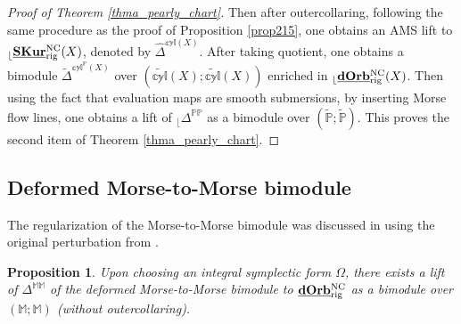 \documentclass[reqno, 10pt]{amsart}
\numberwithin{equation}{section}
\numberwithin{equation}{section}
\newtheorem{prop}[thm]{Proposition}
\theoremstyle{definition}
\theoremstyle{remark}
\newcommand{\mb}{\mathbb}
\renewcommand{\outer}{{}_{\lfloor}}
\newcommand{\wh}{\widehat}
\newcommand{\uds}[1]{\underline{\smash{#1}}}
\begin{document}
\begin{proof}[Proof of Theorem \ref{thma_pearly_chart}]
Then after outercollaring, following the same procedure as the proof of Proposition \ref{prop215}, one obtains an AMS lift  to $\outer \uds{\bf SKur}_{\rm rig}^{\rm NC}(X)$, denoted by $\wh{\mb\Delta}^{\mb{cyl} (X)}$. After taking quotient, one obtains a bimodule $\widetilde{\mb\Delta}^{\mb{cyl}^{\mb P} (X)}$ over $(\widetilde{\mb{cyl}}  (X); \widetilde{\mb{cyl}}  (X))$ enriched in $\outer \uds{\bf dOrb}^{\rm NC}_{\rm rig}(X)$. Then using the fact that evaluation maps are smooth submersions, by inserting Morse flow lines, one obtains a lift of $\outer \mb{\Delta}^{\mb{PP}}$ as a bimodule over $(\tilde{\mb P}; \tilde{\mb P})$. This proves the second item of Theorem \ref{thma_pearly_chart}.
\end{proof}


\subsection{Deformed Morse-to-Morse bimodule}

The regularization of the Morse-to-Morse bimodule was discussed in \cite{Bai_Xu_Arnold} using the original perturbation from \cite{AMS}. 

\begin{prop}
Upon choosing an integral symplectic form $\Omega$, there exists a lift of $ \Delta^{\mb{MM}}$ of the deformed Morse-to-Morse bimodule to $\uds{\bf dOrb}^{\rm NC}_{\rm rig}$ as a bimodule over $(\mb{M}; \mb{M})$ (without outercollaring).
\end{prop}
\end{document}
